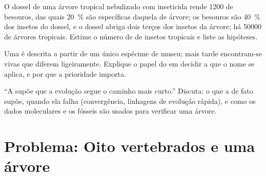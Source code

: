 \begin{exercise}[$\star\star\star$]\label{exo:b1:classifying-biodiversity:10}
O dossel de uma árvore tropical nebulizado com inseticida rende 1200
 de besouros, das quais \qty{20}{\%} são específicas daquela
 de árvore; os besouros são \qty{40}{\%} dos insetos do dossel,
e o dossel abriga dois terços dos insetos da árvore; há \num{50000}
 de árvores tropicais. Estime o número de  de insetos
tropicais e liste as hipóteses.
\end{exercise}

\begin{exercise}[$\star\star\star$]\label{exo:b1:classifying-biodiversity:11}
Uma  é descrita a partir de um único espécime de museu; mais
tarde encontram-se  vivas que diferem ligeiramente. Explique
o papel do  em decidir a que o nome se aplica, e por que a
prioridade importa.
\end{exercise}

\begin{exercise}[$\star\star\star$]\label{exo:b1:classifying-biodiversity:12}
``A  supõe que a evolução segue o caminho mais curto.''
Discuta: o que a  de fato supõe, quando ela falha
(convergência, linhagens de evolução rápida), e como os dados
moleculares e os fósseis são usados para verificar uma árvore.
\end{exercise}

\section{Problema: Oito vertebrados e uma árvore}

